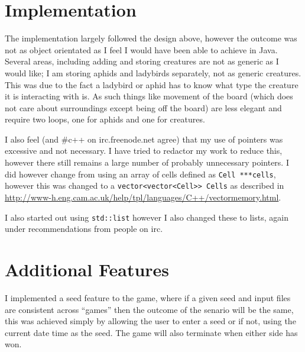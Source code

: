 \documentclass[10pt]{article}
\begin{document}
    \section{Implementation}
        The implementation largely followed the design above, however the outcome was not as object orientated as I feel I would have been able to achieve in Java. Several areas, including adding and storing creatures are not as generic as I would like; I am storing aphids and ladybirds separately, not as generic creatures. This was due to the fact a ladybird or aphid has to know what type the creature it is interacting with is. As such things like movement of the board (which does not care about surroundings except being off the board) are less elegant and require two loops, one for aphids and one for creatures.

        I also feel (and \#c++ on irc.freenode.net agree) that my use of pointers was excessive and not necessary. I have tried to redactor my work to reduce this, however there still remains a large number of probably unnecessary pointers. I did however change from using an array of cells defined as \texttt{Cell ***cells}, however this was changed to a \texttt{vector<vector<Cell>> Cells} as described in \url{http://www-h.eng.cam.ac.uk/help/tpl/languages/C++/vectormemory.html}.

        I also started out using \texttt{std::list} however I also changed these to lists, again under recommendations from people on irc.

    \section{Additional Features}
        I implemented a seed feature to the game, where if a given seed and input files are consistent across ``games'' then the outcome of the senario will be the same, this was achieved simply by allowing the user to enter a seed or if not, using the current date time as the seed. The game will also terminate when either side has won.
\end{document}
